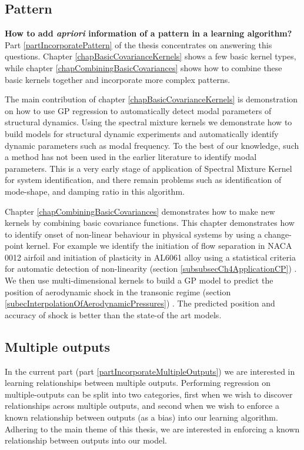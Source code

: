 \subsection{Pattern}\label{subsecPattern}
\textbf{How to add \textit{apriori} information of a pattern in a learning algorithm? } \\
Part \ref{partIncorporatePattern} of the thesis concentrates on answering this questions. Chapter \ref{chapBasicCovarianceKernels} shows a few basic kernel types, while chapter \ref{chapCombiningBasicCovariances} shows how to combine these basic kernels together and incorporate more complex patterns. 

The main contribution of chapter \ref{chapBasicCovarianceKernels} is demonstration on how to use GP regression to automatically detect modal parameters of structural dynamics. Using the spectral mixture kernels we demonstrate how to build models for structural dynamic experiments and automatically identify dynamic parameters such as modal frequency. To the best of our knowledge, such a method has not been used in the earlier literature to identify modal parameters. This is a very early stage of application of Spectral Mixture Kernel for system identification, and there remain problems such as identification of mode-shape, and damping ratio in this algorithm. 

Chapter \ref{chapCombiningBasicCovariances} demonstrates how to make new kernels by combining basic covariance functions. This chapter demonstrates how to identify onset of non-linear behaviour in physical systems by using a change-point kernel. For example we identify the initiation of flow separation in NACA 0012 airfoil and initiation of plasticity in AL6061 alloy using a statistical criteria for automatic detection of non-linearity (section \ref{subsubsecCh4ApplicationCP}) \cite{chiplunkar:hal-01555401}. We then use multi-dimensional kernels to build a GP model to predict the position of aerodynamic shock in the transonic regime (section \ref{subecInterpolationOfAerodynamicPressures}) \cite{oatao18004}. The predicted position and accuracy of shock is better than the state-of the art models. 

\subsection{Multiple outputs}\label{subsecSimulationModel}
In the current part (part \ref{partIncorporateMultipleOutputs}) we are interested in learning relationships between multiple outputs. Performing regression on multiple-outputs can be split into two categories, first when we wish to discover relationships across multiple outputs, and second when we wish to enforce a known relationship between outputs (as a bias) into our learning algorithm. Adhering to the main theme of this thesis, we are interested in enforcing a known relationship between outputs into our model. 

